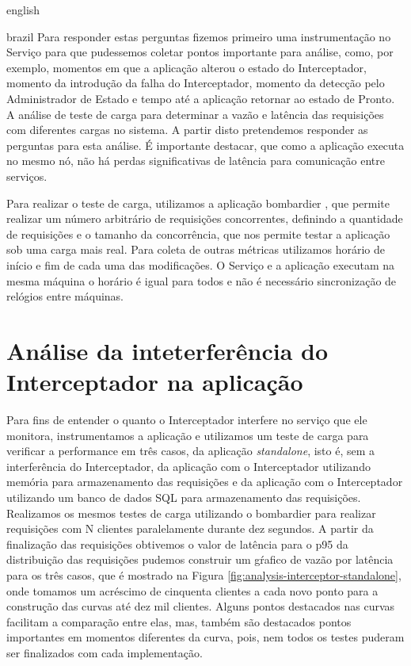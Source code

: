 \begin{otherlanguage*}{english}
\begin{otherlanguage*}{brazil}
Para responder estas perguntas fizemos primeiro uma instrumentação no Serviço para que
pudessemos coletar pontos importante para análise, como, por exemplo, momentos em que a
aplicação alterou o estado do Interceptador, momento da introdução da falha do Interceptador,
momento da detecção pelo Administrador de Estado e tempo até a aplicação retornar ao estado
de Pronto. A análise de teste de carga para determinar a vazão e latência das requisições com
diferentes cargas no sistema. A partir disto pretendemos responder as perguntas para esta
análise. É importante destacar, que como a aplicação executa no mesmo nó, não há perdas
significativas de latência para comunicação entre serviços.

Para realizar o teste de carga, utilizamos a aplicação bombardier \cite{bombardier}, que
permite realizar um número arbitrário de requisições concorrentes, definindo a quantidade
de requisições e o tamanho da concorrência, que nos permite testar a aplicação sob uma
carga mais real. Para coleta de outras métricas utilizamos horário de início e fim de cada
uma das modificações. O Serviço e a aplicação executam na mesma máquina o horário é
igual para todos e não é necessário sincronização de relógios entre máquinas.

\section{Análise da inteterferência do Interceptador na aplicação}

Para fins de entender o quanto o Interceptador interfere no serviço que ele monitora,
instrumentamos a aplicação e utilizamos um teste de carga para verificar a performance
em três casos, da aplicação \textit{standalone}, isto é, sem a interferência do Interceptador,
da aplicação com o Interceptador utilizando memória para armazenamento das requisições e 
da aplicação com o Interceptador utilizando um banco de dados SQL para armazenamento das
requisições. Realizamos os mesmos testes de carga utilizando o bombardier para realizar
requisições com N clientes paralelamente durante dez segundos. A partir da finalização
das requisições obtivemos o valor de latência para o p95 da distribuição das requisições 
pudemos construir um gŕafico de vazão por latência para os três casos, que é mostrado na Figura
\ref{fig:analysis-interceptor-standalone}, onde tomamos um acréscimo de cinquenta clientes a cada
novo ponto para a construção das curvas até dez mil clientes. Alguns pontos destacados nas curvas
facilitam a comparação entre elas, mas, também são destacados pontos importantes em momentos
diferentes da curva, pois, nem todos os testes puderam ser finalizados com cada implementação.


\end{otherlanguage*}
\end{otherlanguage*}
